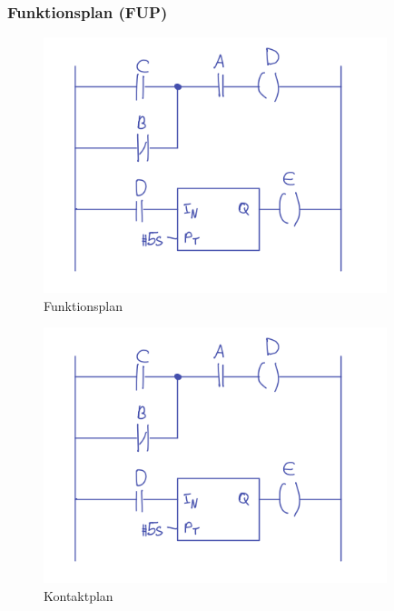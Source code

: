 \subsubsection{Funktionsplan (FUP)}
\begin{figure}[H]
  \includegraphics[width=10cm]{images/KA160322/6a.png}
  \centering
  \caption{Funktionsplan}
\end{figure}

\begin{figure}[H]
  \includegraphics[width=10cm]{images/KA160322/6a.png}
  \centering
  \caption{Kontaktplan}
\end{figure}
